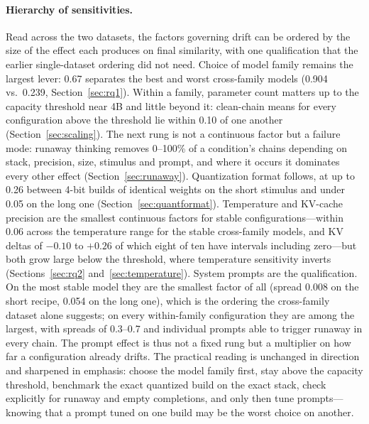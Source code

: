 \documentclass[11pt]{article}
\begin{document}
\paragraph{Hierarchy of sensitivities.}
Read across the two datasets, the factors governing drift can be ordered by
the size of the effect each produces on final similarity, with one
qualification that the earlier single-dataset ordering did not need. Choice of
model family remains the largest lever: 0.67 separates the best and worst
cross-family models (0.904 vs.\ 0.239, Section~\ref{sec:rq1}). Within a
family, parameter count matters up to the capacity threshold near 4B and
little beyond it: clean-chain means for every configuration above the
threshold lie within 0.10 of one another (Section~\ref{sec:scaling}). The
next rung is not a continuous factor but a failure mode: runaway thinking
removes 0--100\% of a condition's chains depending on stack, precision,
size, stimulus and prompt, and where it occurs it dominates every other
effect (Section~\ref{sec:runaway}). Quantization format follows, at up to
0.26 between 4-bit builds of identical weights on the short stimulus and
under 0.05 on the long one (Section~\ref{sec:quantformat}). Temperature and
KV-cache precision are the smallest continuous factors for stable
configurations---within 0.06 across the temperature range for the stable
cross-family models, and KV deltas of $-0.10$ to $+0.26$ of which eight of
ten have intervals including zero---but both grow large below the threshold,
where temperature sensitivity inverts (Sections~\ref{sec:rq2}
and~\ref{sec:temperature}). System prompts are the qualification. On the most
stable model they are the smallest factor of all (spread 0.008 on the short
recipe, 0.054 on the long one), which is the ordering the cross-family
dataset alone suggests; on every within-family configuration they are among
the largest, with spreads of 0.3--0.7 and individual prompts able to trigger
runaway in every chain. The prompt effect is thus not a fixed rung but a
multiplier on how far a configuration already drifts. The practical reading
is unchanged in direction and sharpened in emphasis: choose the model
family first, stay above the capacity threshold, benchmark the exact
quantized build on the exact stack, check explicitly for runaway and empty
completions, and only then tune prompts---knowing that a prompt tuned on one
build may be the worst choice on another.
\end{document}
